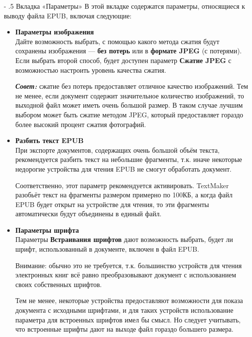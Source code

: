 ﻿\documentclass[a4paper,10pt]{article}
\makeatletter
\renewcommand\paragraph{%
   \@startsection{paragraph}{4}{0mm}%
      {-\baselineskip}%
      {.5\baselineskip}%
      {\normalfont\normalsize\bfseries}}
\makeatother
\begin{document}
 \paragraph{Вкладка «Параметры»}
 В этой вкладке содержатся параметры, относящиеся к выводу файла EPUB, включая следующие: 
 \begin{itemize}
  \item \textbf{Параметры изображения}\\
  Дайте возможность выбрать, с помощью какого метода сжатия будут сохранены изображения — \textbf{без потерь} или в \textbf{формате JPEG} (с потерями). Если выбрать второй способ, будет доступен параметр \textbf{Сжатие JPEG} с возможностью настроить уровень качества сжатия.
  
  \begin{mdframed}[backgroundcolor=blue!10]
\textbf{\textit{Совет:}} сжатие без потерь предоставляет отличное качество изображений. Тем не менее, если документ содержит значительное количество изображений, то выходной файл может иметь очень большой размер. В таком случае лучшим выбором может быть сжатие методом JPEG, который предоставляет гораздо более высокий процент сжатия фотографий.
\end{mdframed}
\item \textbf{Разбить текст EPUB}\\
При экспорте документов, содержащих очень большой объём текста, рекомендуется разбить текст на небольшие фрагменты, т.к. иначе некоторые недорогие устройства для чтения EPUB не смогут обработать документ.

Соответственно, этот параметр рекомендуется активировать. TextMaker разобьёт текст на фрагменты размером примерно по 100КБ, а когда файл EPUB будет открыт на устройстве для чтения, то эти фрагменты автоматически будут объединены в единый файл.
\item \textbf{Параметры шрифта}\\
Параметры \textbf{Встраивания шрифтов} дают возможность выбрать, будет ли шрифт, использованный в документе, включен в файл EPUB.

Внимание: обычно это не требуется, т.к. большинство устройств для чтения электронных книг всё равно преобразовывают документ с использованием своих собственных шрифтов.

Тем не менее, некоторые устройства предоставляют возможности для показа документа с исходными шрифтами, и для таких устройств использование параметра для встроенных шрифтов имел бы смысл. Но следует учитывать, что встроенные шрифты дают на выходе файл гораздо большего размера.


\end{itemize}
\end{document}
